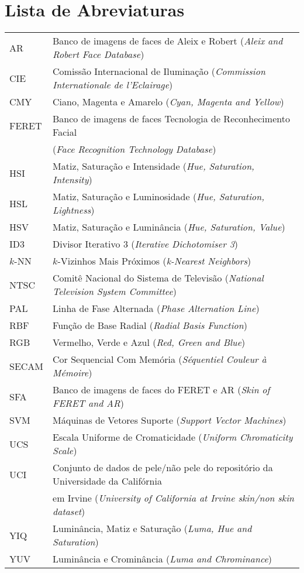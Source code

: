 \documentclass[11pt,twoside,a4paper]{book}
\theoremstyle{plain}
\theoremstyle{definition}
\begin{document}
\chapter{Lista de Abreviaturas}
\begin{tabular}{ll}
    AR          & Banco de imagens de faces de Aleix e Robert (\emph{Aleix and Robert Face Database})\\
    CIE         & Comissão Internacional de Iluminação (\emph{Commission Internationale de l'Eclairage})\\
    CMY         & Ciano, Magenta e Amarelo (\emph{Cyan, Magenta and Yellow})\\
    FERET       & Banco de imagens de faces Tecnologia de Reconhecimento Facial\\                 & (\emph{Face Recognition Technology Database})\\
    HSI         & Matiz, Saturação e Intensidade (\emph{Hue, Saturation, Intensity})\\
    HSL         & Matiz, Saturação e Luminosidade (\emph{Hue, Saturation, Lightness})\\
    HSV         & Matiz, Saturação e Luminância (\emph{Hue, Saturation, Value})\\
    ID3         & Divisor Iterativo 3 (\emph{Iterative Dichotomiser 3})\\
    $k$-NN      & $k$-Vizinhos Mais Próximos (\emph{k-Nearest Neighbors})\\
    NTSC        & Comitê Nacional do Sistema de Televisão (\emph{National Television System Committee})\\
    PAL         & Linha de Fase Alternada (\emph{Phase Alternation Line})\\
    RBF         & Função de Base Radial (\emph{Radial Basis Function})\\
    RGB         & Vermelho, Verde e Azul (\emph{Red, Green and Blue})\\
    SECAM       & Cor Sequencial Com Memória (\emph{Séquentiel Couleur à Mémoire})\\
    SFA         & Banco de imagens de faces do FERET e AR (\emph{Skin of FERET and AR})\\
    SVM         & Máquinas de Vetores Suporte (\emph{Support Vector Machines})\\
    UCS         & Escala Uniforme de Cromaticidade (\emph{Uniform Chromaticity Scale})\\
    UCI         & Conjunto de dados de pele/não pele do repositório da Universidade da Califórnia\\
                & em Irvine (\emph{University of California at Irvine skin/non skin dataset})\\
    YIQ         & Luminância, Matiz e Saturação (\emph{Luma, Hue and Saturation})\\
    YUV         & Luminância e Crominância (\emph{Luma and Chrominance})\\
\end{tabular}
\end{document}
